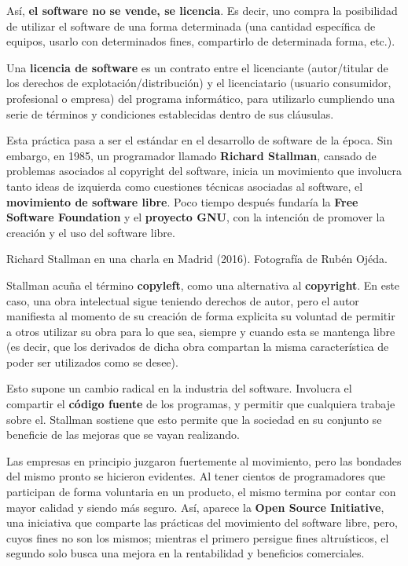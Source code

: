Así, \textbf{el software no se vende, se licencia}. Es decir, uno compra la
posibilidad de utilizar el software de una forma determinada (una cantidad
específica de equipos, usarlo con determinados fines, compartirlo de determinada
forma, etc.).

\begin{definition} Una \textbf{licencia de software}
    es un contrato entre el licenciante (autor/titular de los derechos de
    explotación/distribución) y el licenciatario (usuario consumidor,
    profesional o empresa) del programa informático, para utilizarlo cumpliendo
    una serie de términos y condiciones establecidas dentro de sus cláusulas.
\end{definition}

Esta práctica pasa a ser el estándar en el desarrollo de software de la época.
Sin embargo, en 1985, un programador llamado \textbf{Richard Stallman}, cansado
de problemas asociados al copyright del software, inicia un movimiento que
involucra tanto ideas de izquierda como cuestiones técnicas asociadas al
software, el \textbf{movimiento de software libre}. Poco tiempo después fundaría
la \textbf{Free Software Foundation} y el \textbf{proyecto GNU}, con la
intención de promover la creación y el uso del software
libre.\autocite{salus_2008}

{Richard Stallman en una charla en Madrid (2016).} {Fotografía de Rubén Ojéda.}

Stallman acuña el término \textbf{copyleft}, como una alternativa al
\textbf{copyright}. En este caso, una obra intelectual sigue teniendo derechos
de autor, pero el autor manifiesta al momento de su creación de forma explicita
su voluntad de permitir a otros utilizar su obra para lo que sea, siempre y
cuando esta se mantenga libre (es decir, que los derivados de dicha obra
compartan la misma característica de poder ser utilizados como se desee).

Esto supone un cambio radical en la industria del software. Involucra el
compartir el \textbf{código fuente} de los programas, y permitir que cualquiera
trabaje sobre el. Stallman sostiene que esto permite que la sociedad en su
conjunto se beneficie de las mejoras que se vayan realizando.

Las empresas en principio juzgaron fuertemente al movimiento, pero las bondades
del mismo pronto se hicieron evidentes. Al tener cientos de programadores que
participan de forma voluntaria en un producto, el mismo termina por contar con
mayor calidad y siendo más seguro. Así, aparece la \textbf{Open Source
Initiative}, una iniciativa que comparte las prácticas del movimiento del
software libre, pero, cuyos fines no son los mismos; mientras el primero
persigue fines altruísticos, el segundo solo busca una mejora en la rentabilidad
y beneficios comerciales.

